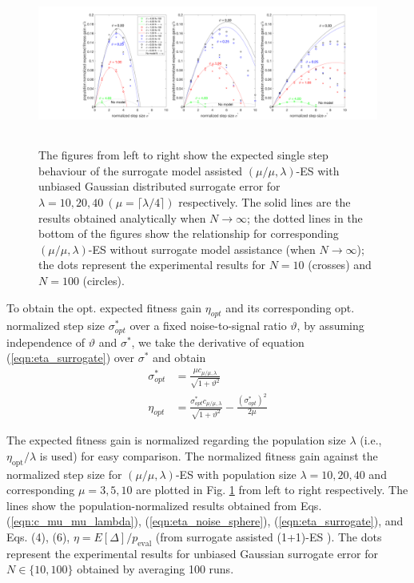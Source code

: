 \begin{center}
\begin{figure}
\includegraphics[height=2.1in, width=6.0in]{expectedFitGain_final_2}
\caption{The figures from left to right show the expected single step behaviour of the surrogate model assisted $(\mu/\mu,\lambda)$-ES with unbiased Gaussian distributed surrogate error for $\lambda=10,20,40\ (\mu = \lceil \lambda/4 \rceil)$ respectively. The solid lines are the results obtained analytically when $N \rightarrow \infty$; the dotted lines in the bottom of the figures show the relationship for corresponding $(\mu/\mu,\lambda)$-ES without surrogate model assistance (when $N\rightarrow \infty$); the dots represent the experimental results for $N=10$ (crosses) and $N=100$ (circles). 
}
\label{fig:expectedFitGain}
\end{figure}
\end{center}

To obtain the opt. expected fitness gain $\eta_{opt}$ and its corresponding opt. normalized step size $\sigma^*_{opt}$ over a fixed noise-to-signal ratio $\vartheta$, by assuming independence of $\vartheta$ and $\sigma^*$, we take the derivative of equation (\ref{eqn:eta_surrogate}) over $\sigma^*$ and obtain
\begin{align}\label{eqn:opt_surrogate}
\sigma^*_{opt} &= \frac{ \mu c_{\mu / \mu, \lambda}}{\sqrt {1+ \vartheta^2}}\\
\eta_{opt} &= \frac{\sigma^*_{opt} c_{\mu / \mu, \lambda}}{\sqrt {1+ \vartheta^2}} - \frac{(\sigma^*_{opt})^2}{2 \mu} 
\end{align}

The expected fitness gain is normalized regarding the population size $\lambda$ (i.e., $\eta_{\text{opt}}/\lambda$ is used) for easy comparison. The normalized fitness gain against the normalized step size for $(\mu/\mu,\lambda)$-ES with population size $\lambda=10,20,40$ and corresponding $\mu=3,5,10$ are plotted in Fig. \ref{fig:expectedFitGain} from left to right respectively. The lines show the population-normalized results obtained from Eqs. (\ref{eqn:c_mu_mu_lambda}), (\ref{eqn:eta_noise_sphere}), (\ref{eqn:eta_surrogate}), and Eqs. (4), (6), $\eta = E[\Delta]/p_{\text{eval}}$ (from surrogate assisted (1+1)-ES \cite{DBLP:conf/ppsn/KayhaniA18}). The dots represent the experimental results for unbiased Gaussian surrogate error for $N \in \{10,100 \}$ obtained by averaging 100 runs. 

